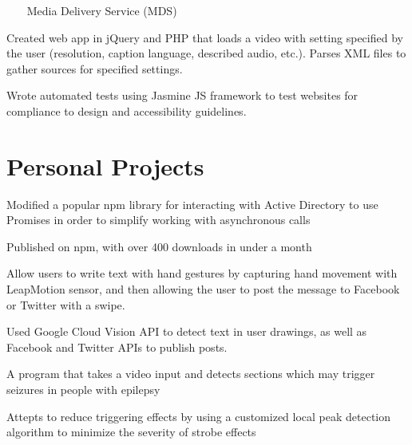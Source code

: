 \documentclass[]{deedy-resume-openfont}
\begin{document}
\begin{minipage}[t]{0.66\textwidth}
~~~ Media Delivery Service (MDS)
\begin{tightemize}
\item Created web app in jQuery and PHP that loads a video with setting specified by the user (resolution, caption language, described audio, etc.). Parses XML files to gather sources for specified settings.
\item Wrote automated tests using Jasmine JS framework to test websites for compliance to design and accessibility guidelines.
\end{tightemize}
\sectionsep


\section{Personal Projects}


\begin{tightemize}
\item Modified a popular npm library for interacting with Active Directory to use Promises in order to simplify working with asynchronous calls 
\item Published on npm, with over 400 downloads in under a month 
\end{tightemize}
\sectionsep


\begin{tightemize}
\item Allow users to write text with hand gestures by capturing hand movement with LeapMotion sensor, and then allowing the user to post the message to Facebook or Twitter with a swipe. 
\item Used Google Cloud Vision API to detect text in user drawings, as well as Facebook and Twitter APIs to publish posts.
\end{tightemize}
\sectionsep

\begin{tightemize}
\item A program that takes a video input and detects sections which may trigger seizures in people with epilepsy
\item Attepts to reduce triggering effects by using a customized local peak detection algorithm to minimize the severity of strobe effects
\end{tightemize}
\sectionsep


\end{minipage} 
\end{document}
